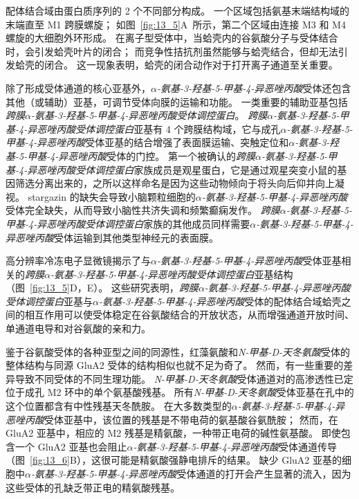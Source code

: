 配体结合域由蛋白质序列的 2 个不同部分构成。
一个区域包括氨基末端结构域的末端直至 M1 跨膜螺旋；
如图~\ref{fig:13_5}A~所示，第二个区域由连接 M3 和 M4 螺旋的大细胞外环形成。
在离子型受体中，当蛤壳内的谷氨酸分子与受体结合时，会引发蛤壳叶片的闭合；
而竞争性拮抗剂虽然能够与蛤壳结合，但却无法引发蛤壳的闭合。
这一现象表明，蛤壳的闭合动作对于打开离子通道至关重要。


除了形成受体通道的核心亚基外，\textit{$\alpha$-氨基-3-羟基-5-甲基-4-异恶唑丙酸}受体还包含其他（或辅助）亚基，可调节受体向膜的运输和功能。
一类重要的辅助亚基包括\textit{跨膜$\alpha$-氨基-3-羟基-5-甲基-4-异恶唑丙酸受体调控蛋白}。
\textit{跨膜$\alpha$-氨基-3-羟基-5-甲基-4-异恶唑丙酸受体调控蛋白}亚基有 4 个跨膜结构域，它与成孔\textit{$\alpha$-氨基-3-羟基-5-甲基-4-异恶唑丙酸}受体亚基的结合增强了表面膜运输、突触定位和\textit{$\alpha$-氨基-3-羟基-5-甲基-4-异恶唑丙酸}受体的门控。
第一个被确认的\textit{跨膜$\alpha$-氨基-3-羟基-5-甲基-4-异恶唑丙酸受体调控蛋白}家族成员是观星蛋白，它是通过观星突变小鼠的基因筛选分离出来的，之所以这样命名是因为这些动物倾向于将头向后仰并向上凝视。
stargazin 的缺失会导致小脑颗粒细胞的\textit{$\alpha$-氨基-3-羟基-5-甲基-4-异恶唑丙酸}受体完全缺失，从而导致小脑性共济失调和频繁癫痫发作。
\textit{跨膜$\alpha$-氨基-3-羟基-5-甲基-4-异恶唑丙酸受体调控蛋白}家族的其他成员同样需要\textit{$\alpha$-氨基-3-羟基-5-甲基-4-异恶唑丙酸}受体运输到其他类型神经元的表面膜。


高分辨率冷冻电子显微镜揭示了与\textit{$\alpha$-氨基-3-羟基-5-甲基-4-异恶唑丙酸}受体亚基相关的\textit{跨膜$\alpha$-氨基-3-羟基-5-甲基-4-异恶唑丙酸受体调控蛋白}亚基结构（图~\ref{fig:13_5}D，E）。
这些研究表明，\textit{跨膜$\alpha$-氨基-3-羟基-5-甲基-4-异恶唑丙酸受体调控蛋白}亚基与\textit{$\alpha$-氨基-3-羟基-5-甲基-4-异恶唑丙酸}受体的配体结合域蛤壳之间的相互作用可以使受体稳定在谷氨酸结合的开放状态，从而增强通道开放时间、单通道电导和对谷氨酸的亲和力。


鉴于谷氨酸受体的各种亚型之间的同源性，红藻氨酸和\textit{N-甲基-D-天冬氨酸}受体的整体结构与同源 GluA2 受体的结构相似也就不足为奇了。
然而，有一些重要的差异导致不同受体的不同生理功能。 
\textit{N-甲基-D-天冬氨酸}受体通道对的高渗透性已定位于成孔 M2 环中的单个氨基酸残基。
所有\textit{N-甲基-D-天冬氨酸}受体亚基在孔中的这个位置都含有中性残基天冬酰胺。
在大多数类型的\textit{$\alpha$-氨基-3-羟基-5-甲基-4-异恶唑丙酸}受体亚基中，该位置的残基是不带电荷的氨基酸谷氨酰胺；
然而，在 GluA2 亚基中，相应的 M2 残基是精氨酸，一种带正电荷的碱性氨基酸。
即使包含一个 GluA2 亚基也会阻止\textit{$\alpha$-氨基-3-羟基-5-甲基-4-异恶唑丙酸}受体通道传导（图~\ref{fig:13_6}B），这很可能是精氨酸强静电排斥的结果。
缺少 GluA2 亚基的细胞中\textit{$\alpha$-氨基-3-羟基-5-甲基-4-异恶唑丙酸}受体通道的打开会产生显著的流入，因为这些受体的孔缺乏带正电的精氨酸残基。


